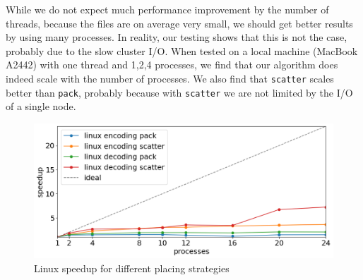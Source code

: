 While we do not expect much performance improvement by the number of threads, because the files are on average very small, we should get better results by using many processes. In reality, our testing shows that this is not the case, probably due to the slow cluster I/O. When tested on a local machine (MacBook A2442) with one thread and 1,2,4 processes, we find that our algorithm does indeed scale with the number of processes.
We also find that \verb|scatter| scales better than \verb|pack|, probably because with \verb|scatter| we are not limited by the I/O of a single node.
\begin{figure}
	\centering
	\includegraphics[width=1\linewidth]{"../imgs/linux speedup"}
	\caption{Linux speedup for different placing strategies}
	\label{fig:linux-scatter-pack}
\end{figure}

